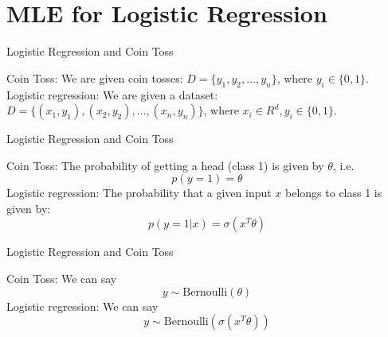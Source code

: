 \documentclass{beamer}
\begin{document}
\section{MLE for Logistic Regression}


\begin{frame}{Logistic Regression and Coin Toss}

    Coin Toss: We are given coin tosses: $D = \{y_1, y_2, \ldots, y_n\}$, where $y_i\in \{0,1\}$. \\
    \vspace{10pt}
    \pause  Logistic regression: We are given a dataset: $D = \{(x_1, y_1), (x_2,y_2), \ldots, (x_n, y_n)\}$, where $x_i\in R^d, y_i\in \{0,1\}$. \\

    

    

    
\end{frame}

\begin{frame}{Logistic Regression and Coin Toss}

    Coin Toss: The probability of getting a head (class 1) is given by $\theta$, i.e.
    $$p(y=1) = \theta$$
    \vspace{10pt}
    \pause 
    Logistic regression: The probability that a given input $x$ belongs to class 1 is given by:
    $$p(y=1|x) = \sigma(x^T\theta)$$
\end{frame}

\begin{frame}{Logistic Regression and Coin Toss}

    Coin Toss: We can say 
    $$y \sim \text{Bernoulli}(\theta)$$
    \vspace{10pt}
    \pause 
    Logistic regression: We can say
    $$y \sim \text{Bernoulli}(\sigma(x^T\theta))$$
\end{frame}\


                
                
        
        
        
\end{document}

